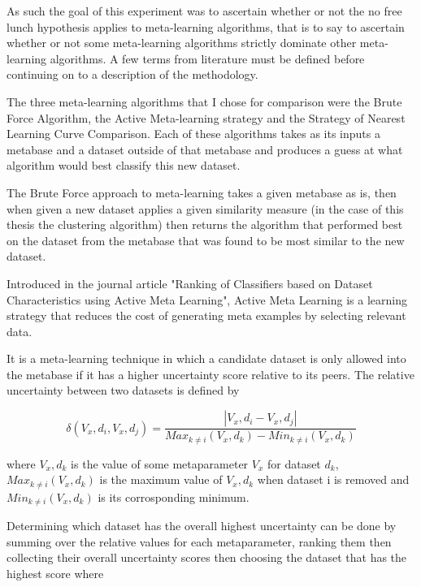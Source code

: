 As such the goal of this experiment was  to ascertain whether or not the no free
lunch hypothesis applies to meta-learning algorithms, that is to say to
ascertain whether or not some meta-learning algorithms strictly dominate other
meta-learning algorithms.
A few terms from literature must be defined before continuing on to a
description of the methodology.

The three meta-learning algorithms that I chose for comparison were the Brute
Force Algorithm, the Active Meta-learning strategy and the Strategy of Nearest
Learning Curve Comparison. Each of these algorithms takes as its inputs a
metabase and a dataset outside of that metabase and produces a guess at what
algorithm would best classify this new dataset.

The Brute Force approach to meta-learning takes a given metabase as is, then
when given a new dataset applies a given similarity measure (in the case of this
thesis the clustering algorithm) then returns the algorithm that performed
best on the dataset from the metabase that was found to be most similar to the
new dataset.

Introduced in the journal article "Ranking of Classifiers based on Dataset
Characteristics using Active Meta Learning", Active Meta Learning is a learning
strategy that reduces the cost of generating meta examples by selecting relevant
data.

It is a meta-learning technique in which a candidate dataset is only
allowed into the metabase if it has a higher uncertainty score relative to its
peers. The relative uncertainty between two datasets is defined by

$$\delta(V_x,d_i,V_x,d_j) = \frac{|V_x,d_i - V_x,d_j|}{Max_{k\neq i}(V_x,d_k)- Min_{k\neq i}(V_x,d_k)}$$

where $V_x,d_k$ is the value of some metaparameter $V_x$ for dataset $d_k$,
$Max_{k\neq i}(V_x,d_k)$ is the maximum value of $V_x,d_k$ when dataset i is
removed and $Min_{k\neq i}(V_x,d_k)$ is its corrosponding minimum.

Determining which dataset has the overall highest uncertainty can be done by
summing over the relative values for each metaparameter, ranking them then
collecting their overall uncertainty scores then choosing the dataset that has
the highest score where

